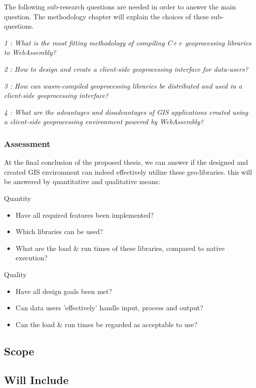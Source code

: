 The following sub-research questions are needed in order to answer the main question. The methodology chapter will explain the choices of these sub-questions. 

\textit{1 : What is the most fitting methodology of compiling C++ geoprocessing libraries to WebAssembly?}

\textit{2 : How to design and create a client-side geoprocessing interface for data-users?}

\textit{3 : How can wasm-compiled geoprocessing libraries be distributed and used in a client-side geoprocessing interface?}

\textit{4 : What are the advantages and disadvantages of GIS applications created using a client-side geoprocessing environment powered by WebAssembly?}

\newpage
\subsubsection*{Assessment}

At the final conclusion of the proposed thesis, we can answer if the designed and created GIS environment can indeed effectively utilize these geo-libraries.
this will be answered by quantitative and qualitative means:

Quantity
\begin{itemize}
    \item Have all required features been implemented?
    \item Which libraries can be used?
    \item What are the load \& run times of these libraries, compared to native execution?
\end{itemize} 

Quality
\begin{itemize}
    \item Have all design goals been met?
    \item Can data users 'effectively' handle input, process and output?
    \item Can the load \& run times be regarded as acceptable to use? 
\end{itemize} 


\subsection{Scope}


\subsection*{Will Include}

